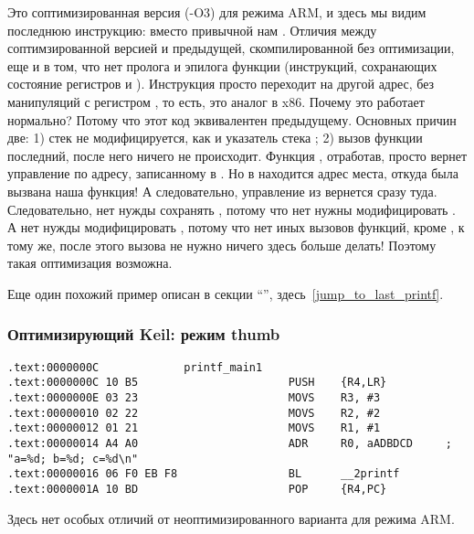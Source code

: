 Это соптимизированная версия (-O3) для режима ARM, и здесь мы видим последнюю инструкцию:  вместо привычной
нам . 
Отличия между соптимзированной версией и предыдущей, скомпилированной без оптимизации, еще и в том, 
что нет пролога и эпилога функции (инструкций, сохранающих состояние регистров  и \LR).
Инструкция  просто переходит на другой адрес, без манипуляций с регистром \LR, то есть,
это аналог \JMP в x86.
Почему это работает нормально? Потому что этот код эквивалентен предыдущему.
Основных причин две: 1) стек не модифицируется, как и указатель стека \SP; 2) вызов функции \printf последний, 
после него ничего не происходит.
Функция \printf, отработав, просто вернет управление по адресу, записанному в \LR. Но в \LR находится адрес места,
откуда была вызвана наша функция! А следовательно, управление из \printf вернется сразу туда.
Следовательно, нет нужды сохранять \LR, потому что нет нужны модифицировать \LR. 
А нет нужды модифицировать \LR,
потому что нет иных вызовов функций, кроме \printf, к тому же, после этого вызова не нужно ничего здесь 
больше делать! Поэтому такая оптимизация возможна.

Еще один похожий пример описан в секции ``\SwitchCaseDefaultSectionName'', здесь~\ref{jump_to_last_printf}.

\subsubsection{Оптимизирующий Keil: режим thumb}

\begin{lstlisting}
.text:0000000C             printf_main1
.text:0000000C 10 B5                       PUSH    {R4,LR}
.text:0000000E 03 23                       MOVS    R3, #3
.text:00000010 02 22                       MOVS    R2, #2
.text:00000012 01 21                       MOVS    R1, #1
.text:00000014 A4 A0                       ADR     R0, aADBDCD     ; "a=%d; b=%d; c=%d\n"
.text:00000016 06 F0 EB F8                 BL      __2printf
.text:0000001A 10 BD                       POP     {R4,PC}
\end{lstlisting}

Здесь нет особых отличий от неоптимизированного варианта для режима ARM.


